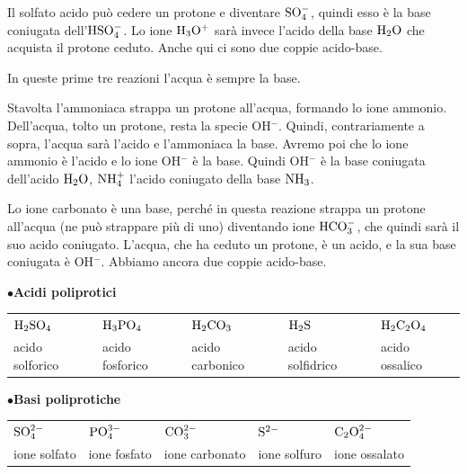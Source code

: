 \vspace{0.2cm}Il solfato acido può cedere un protone e diventare $\rm SO_4^-$, quindi esso è la base coniugata dell'$\rm HSO_4^-$. Lo ione $\rm H_3O^+$ sarà invece l'acido della base $\rm H_2O$ che acquista il protone ceduto. Anche qui ci sono due coppie acido-base.

\vspace{0.2cm}In queste prime tre reazioni l'acqua è sempre la base.

\vspace{0.2cm}

\vspace{0.2cm}Stavolta l'ammoniaca strappa un protone all'acqua, formando lo ione ammonio. Dell'acqua, tolto un protone, resta la specie OH$^-$. Quindi, contrariamente a sopra, l'acqua sarà l'acido e l'ammoniaca la base. Avremo poi che lo ione ammonio è l'acido e lo ione OH$^-$ è la base. Quindi OH$^-$ è la base coniugata dell'acido $\rm H_2O$, $\rm NH_4^+$ l'acido coniugato della base $\rm NH_3$.

\vspace{0.2cm}

\vspace{0.2cm}Lo ione carbonato è una base, perché in questa reazione strappa un protone all'acqua (ne può strappare più di uno) diventando ione $\rm HCO_3^-$, che quindi sarà il suo acido coniugato. L'acqua, che ha ceduto un protone, è un acido, e la sua base coniugata è OH$^-$. Abbiamo ancora due coppie acido-base.

\vspace{0.2cm}$\bullet$\textbf{Acidi poliprotici}
\begin{center}
\begin{tabular}{lllll}
    $\rm H_2SO_4$ & $\rm H_3PO_4$ & $\rm H_2CO_3$ & $\rm H_2S$ & $\rm H_2C_2O_4$\\
    acido solforico & acido fosforico & acido carbonico & acido solfidrico & acido ossalico    
\end{tabular}
\end{center}
\vspace{0.2cm}$\bullet$\textbf{Basi poliprotiche}
\begin{center}
\begin{tabular}{lllll}
    $\rm SO_4^{2-}$ & $\rm PO_4^{3-}$ & $\rm CO_3^{2-}$ & $\rm S^{2-}$ & $\rm C_2O_4^{2-}$\\
    ione solfato & ione fosfato & ione carbonato & ione solfuro & ione ossalato    
\end{tabular}
\end{center}


